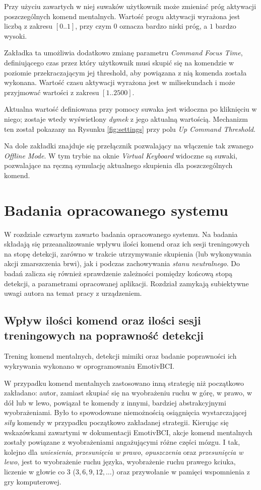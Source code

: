 \documentclass[skorowidz,skroty]{dyplomWEZUT}
\begin{document}
Przy użyciu zawartych w niej suwaków użytkownik może zmieniać próg aktywacji poszczególnych komend mentalnych. Wartość progu aktywacji wyrażona jest liczbą z zakresu $[0..1]$, przy czym $0$ oznacza bardzo niski próg, a $1$ bardzo wysoki.

Zakładka ta umożliwia dodatkowo zmianę parametru \textit{Command Focus Time}, definiującego czas przez który użytkownik musi skupić się na komendzie w poziomie przekraczającym jej threshold, aby powiązana z nią komenda została wykonana. Wartość czasu aktywacji wyrażona jest w milisekundach i może przyjmować wartości z zakresu $[1..2500]$.

Aktualna wartość definiowana przy pomocy suwaka jest widoczna po kliknięciu w niego; zostaje wtedy wyświetlony \textit{dymek} z jego aktualną wartością. Mechanizm ten został pokazany na Rysunku \vref{fig:settings} przy polu \textit{Up Command Threshold}.

Na dole zakładki znajduje się przełącznik pozwalający na włączenie tak zwanego \textit{Offline Mode}. W tym trybie na oknie \textit{Virtual Keyboard} widoczne są suwaki, pozwalające na ręczną symulację aktualnego skupienia dla poszczególnych komend.

\chapter{Badania opracowanego systemu}
W rozdziale czwartym zawarto badania opracowanego systemu. Na badania składają się przeanalizowanie wpływu ilości komend oraz ich sesji treningowych na stopę detekcji, zarówno w trakcie utrzymywanie skupienia (lub wykonywania akcji zmarszczenia brwi), jak i podczas zachowywania \textit{stanu neutralnego}. Do badań zalicza się również sprawdzenie zależności pomiędzy końcową stopą detekcji, a parametrami opracowanej aplikacji. Rozdział zamykają subiektywne uwagi autora na temat pracy z urządzeniem.  

\section{Wpływ ilości komend oraz ilości sesji treningowych na poprawność detekcji\label{sec:training_sessions}}
Trening komend mentalnych, detekcji mimiki oraz badanie poprawności ich wykrywania wykonano w oprogramowaniu EmotivBCI.

W przypadku komend mentalnych zastosowano inną strategię niż początkowo zakładano: autor, zamiast skupiać się na wyobrażeniu ruchu w górę, w prawo, w dół lub w lewo, powiązał te komendy z innymi, bardziej abstrakcyjnymi wyobrażeniami. Było to spowodowane niemożnością osiągnięcia wystarczającej \textit{siły} komendy w przypadku początkowo zakładanej strategii. Kierując się wskazówkami zawartymi w dokumentacji EmotivBCI, akcje komend mentalnych zostały powiązane z wyobrażeniami angażującymi różne części mózgu. I tak, kolejno dla \textit{uniesienia}, \textit{przesunięcia w prawo}, \textit{opuszczenia} oraz \textit{przesunięcia w lewo}, jest to wyobrażenie ruchu języka, wyobrażenie ruchu prawego kciuka, liczenie w głowie co $3$ ($3, 6, 9, 12, \dots$) oraz przywołanie w pamięci wspomnienia z gry komputerowej. 
\end{document}
